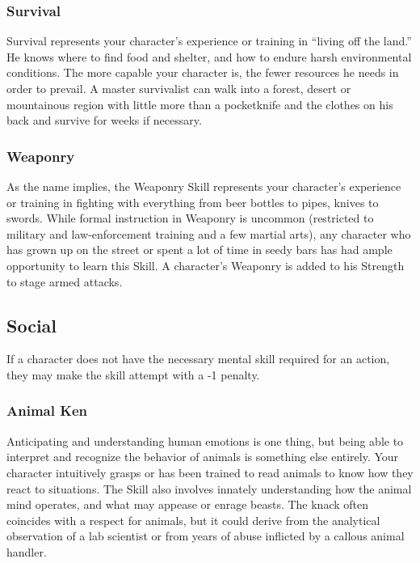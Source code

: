 \documentclass["../Misguided by Starlight.tex"]{subfiles}
\begin{document}
\subsubsection{Survival}
Survival represents your character’s experience or training in “living off the land.” He knows where to find food and shelter, and how to endure harsh environmental conditions. The more capable your character is, the fewer resources he needs in order to prevail. A master survivalist can walk into a forest, desert or mountainous region with little more than a pocketknife and the clothes on his back and survive for weeks if necessary.

\subsubsection{Weaponry}
As the name implies, the Weaponry Skill represents your character’s experience or training in fighting with everything from beer bottles to pipes, knives to swords. While formal instruction in Weaponry is uncommon (restricted to military and law-enforcement training and a few martial arts), any character who has grown up on the street or spent a lot of time in seedy bars has had ample opportunity to learn this Skill. A character’s Weaponry is added to his Strength to stage armed attacks. 


\subsection{Social}
If a character does not have the necessary mental skill required for an action, they may make the skill attempt with a -1 penalty.

\subsubsection{Animal Ken}
Anticipating and understanding human emotions is one thing, but being able to interpret and recognize the behavior of animals is something else entirely. Your character intuitively grasps or has been trained to read animals to know how they react to situations. The Skill also involves innately understanding how the animal mind operates, and what may appease or enrage beasts. The knack often coincides with a respect for animals, but it could derive from the analytical observation of a lab scientist or from years of abuse inflicted by a callous animal handler.
\end{document}
